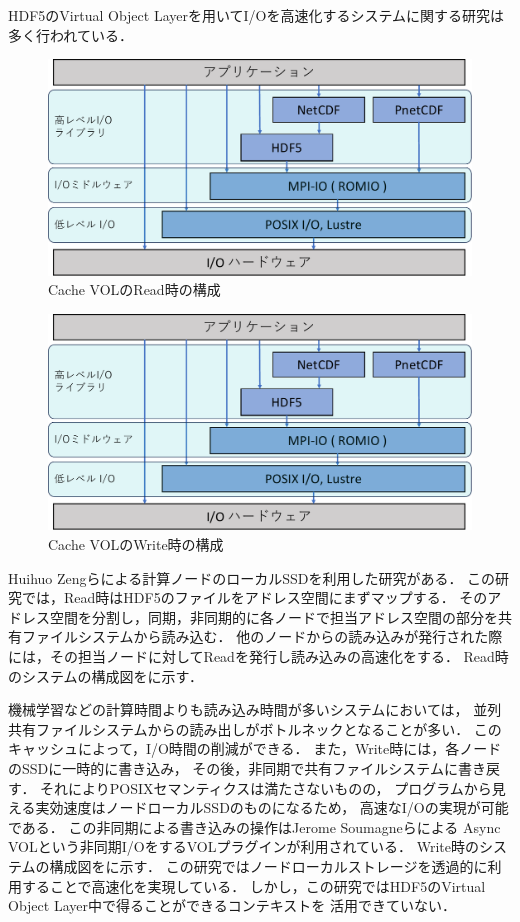 \documentclass[submit,techrep,noauthor]{ipsj}
\begin{document}
HDF5のVirtual Object Layerを用いてI/Oを高速化するシステムに関する研究は多く行われている．

\begin{figure}[tbp]
	\centering
	\includegraphics[page=4,width=\linewidth]{figure-crop.pdf}
	\caption{Cache VOLのRead時の構成}
	\label{fig:cachevolread}
\end{figure}

\begin{figure}[tbp]
	\centering
	\includegraphics[page=5,width=\linewidth]{figure-crop.pdf}
	\caption{Cache VOLのWrite時の構成}
	\label{fig:cachevolwrite}
\end{figure}

Huihuo Zengらによる計算ノードのローカルSSDを利用した研究がある\cite{zheng2022hdf5}．
この研究では，Read時はHDF5のファイルをアドレス空間にまずマップする．
そのアドレス空間を分割し，同期，非同期的に各ノードで担当アドレス空間の部分を共有ファイルシステムから読み込む．
他のノードからの読み込みが発行された際には，その担当ノードに対してReadを発行し読み込みの高速化をする．
Read時のシステムの構成図をに示す．

機械学習などの計算時間よりも読み込み時間が多いシステムにおいては，
並列共有ファイルシステムからの読み出しがボトルネックとなることが多い．
このキャッシュによって，I/O時間の削減ができる．
また，Write時には，各ノードのSSDに一時的に書き込み，
その後，非同期で共有ファイルシステムに書き戻す．
それによりPOSIXセマンティクスは満たさないものの，
プログラムから見える実効速度はノードローカルSSDのものになるため，
高速なI/Oの実現が可能である．
この非同期による書き込みの操作はJerome Soumagneらによる
Async VOL\cite{tang2021transparent}という非同期I/OをするVOLプラグインが利用されている．
Write時のシステムの構成図をに示す．
この研究ではノードローカルストレージを透過的に利用することで高速化を実現している．
しかし，この研究ではHDF5のVirtual Object Layer中で得ることができるコンテキストを
活用できていない．
\end{document}
